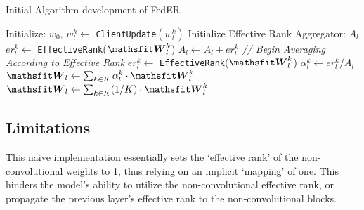 \begin{algorithm}
\caption{Initial Algorithm development of FedER}\label{alg:init}
\begin{algorithmic}[1]
\State Initialize: $w_0$, 
        \State $w_{t}^{k} \leftarrow$ \texttt{ClientUpdate}$(w_{t}^{k})$ 
    \EndFor
    \State Initialize Effective Rank Aggregator: $A_l$
         
            \State $er_{l}^{k} \leftarrow $ \texttt{EffectiveRank}($\tW_l^{k}$) 
            \State $A_l \leftarrow A_l + er_{l}^{k}$
        \EndIf
    \EndFor
    \State \textit{// Begin Averaging According to Effective Rank}
         
            \State $er_{l}^{k} \leftarrow $ \texttt{EffectiveRank}($\tW_l^{k}$) 
            \State $\alpha_l^k \leftarrow er_{l}^{k}/A_l$
            \State $\tW_l \leftarrow \sum_{k \in K} \alpha_l^k \cdot \tW_l^{k}$
        \EndIf
         
            \State $\tW_l \leftarrow \sum_{k \in K} (1/K) \cdot \tW_l^{k}$
        \EndIf
    \EndFor
\EndFor
\EndProcedure
\end{algorithmic}
\end{algorithm}

\subsection{Limitations}
This naive implementation essentially sets the `effective rank' of the non-convolutional weights to 1, thus relying on an implicit `mapping' of one. This hinders the model's ability to utilize the non-convolutional effective rank, or propagate the previous layer's effective rank to the non-convolutional blocks. \\

